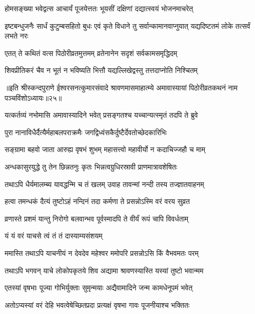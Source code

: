 \twolineshloka
{होमसङ्ख्या भवेद्वत्स आचार्यं पूजयेत्ततः}
{भूयसीं दक्षिणां दद्यात्स्वयं भोजनमाचरेत्} %


\threelineshloka
{इष्टबन्धुजनैः सार्धं कुटुम्बसहितो बुधः}
{एवं कृते विधाने तु सर्वान्कामानवाप्नुयात्}
{यद्यदिष्टतमं लोके तत्सर्वं लभते नरः} %

\twolineshloka
{एतत् ते कथितं वत्स पिठोरीव्रतमुत्तमम्}
{व्रतेनानेन सदृशं सर्वकामसमृद्धिदम्} %

\twolineshloka
{शिवप्रीतिकरं चैव न भूतं न भविष्यति}
{भित्तौ यद्यल्लिखेद्वस्तु तत्तदाप्नोति निश्चितम्} %


{॥इति श्रीस्कन्दपुराणे ईश्वरसनत्कुमारसंवादे श्रावणमासमाहात्म्ये अमावास्यायां पिठोरीव्रतकथनं नाम पञ्चविंशोऽध्यायः॥२५॥}





\twolineshloka
{यत्कर्तव्यं नभोमासि अमावास्यादिने भवेत्}
{प्रसङ्गतश्च यच्चान्यत्स्मृतं तदपि ते ब्रुवे} %

\twolineshloka
{पुरा नानाविधैर्दैत्यैर्महाबलपराक्रमैः}
{जगद्विध्वंसकैर्दुष्टैर्देवतोच्छेदकारिभिः } %

\twolineshloka
{सङ्ग्रामा बहवो जाता आरुह्य वृषभं शुभम्}
{महासत्त्वो महावीर्यो न कदाचिज्जहौ च माम्} %

\twolineshloka
{अन्धकासुरयुद्धे तु तेन छिन्नतनुः कृतः}
{भिन्नत्वग्रुधिरस्रावी प्राणमात्रावशेषितः} %

\twolineshloka
{तथाऽपि धैर्यमालम्ब्य यावद्धन्मि च तं खलम्}
{उवाह तावन्मां नन्दी तस्य तज्ज्ञातवाहनम्} %

\twolineshloka
{हत्वा तमन्धकं दैत्यं तुष्टोऽहं नन्दिनं तदा}
{कर्मणा ते प्रसन्नोऽस्मि वरं वरय सुव्रत} %

\twolineshloka
{व्रणास्ते प्रशमं यान्तु निरोगो बलवान्भव}
{पूर्वस्मादपि ते वीर्यं रूपं चापि विवर्धताम्} %

\onelineshloka
{यं यं वरं याचसे त्वं तं तं दास्याम्यसंशयम्} %


\twolineshloka
{ममास्ति तथाऽपि याचनीयं न देवदेव महेश्वर}
{ममोपरि प्रसन्नोऽसि किं वैभवमतः परम्} %

\twolineshloka
{तथाऽपि भगवन् याचे लोकोपकृतये शिव}
{अद्यामा श्रावणस्यास्ति यस्यां तुष्टो भवान्मम} %

\twolineshloka
{एतस्यां वृषभाः पूज्या गोभिर्युक्ताः सुमृन्मयाः}
{अद्यैवामादिने जन्म कामधेनूपमं भवेत्} %

\twolineshloka
{अतोऽप्यस्यां वरं देहि भवत्वेषेच्छितप्रदा}
{प्रत्यक्षं वृषभा गावः पूजनीयाश्च भक्तितः} %

